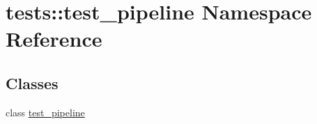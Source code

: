 \hypertarget{namespacetests_1_1test__pipeline}{\section{tests\-:\-:test\-\_\-pipeline \-Namespace \-Reference}
\label{namespacetests_1_1test__pipeline}
}
\subsection*{\-Classes}
\begin{DoxyCompactItemize}
\item 
class \hyperlink{classtests_1_1test__pipeline_1_1test__pipeline}{test\-\_\-pipeline}
\end{DoxyCompactItemize}
